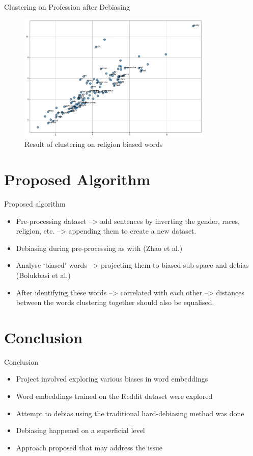 \documentclass{beamer}
\begin{document}
\begin{frame}{Clustering on Profession after Debiasing}
	\vspace{3mm}
	\begin{figure}[H]
		\centerline{\includegraphics[width=25em]{dwe6.png}}
		\caption{Result of clustering on religion biased words}
		\label{profession-debias-fig}
	\end{figure}
\end{frame}
		
	
	

	\section{Proposed Algorithm}
		\begin{frame}{Proposed algorithm}
			\begin{itemize}
				\item Pre-processing dataset --> add sentences by inverting the gender, races, religion, etc. --> appending them to create a new dataset.
				\item Debiasing during pre-processing as with (Zhao et al.)
				\item  Analyse `biased' words --> projecting them to biased sub-space and debias (Bolukbasi et al.)
				\item After identifying these words --> correlated with each other --> distances between the words clustering together should also be equalised.
			\end{itemize}
		\end{frame}
	
		
	\section{Conclusion}
	\begin{frame}{Conclusion}
		\begin{itemize}
			\item Project involved exploring various biases in word embeddings
			\item Word embeddings trained on the Reddit dataset were explored
			\item Attempt to debias using the traditional hard-debiasing method was done
			\item Debiasing happened on a superficial level
			\item Approach proposed that may address the issue
		\end{itemize}
	\end{frame}
\end{document}
